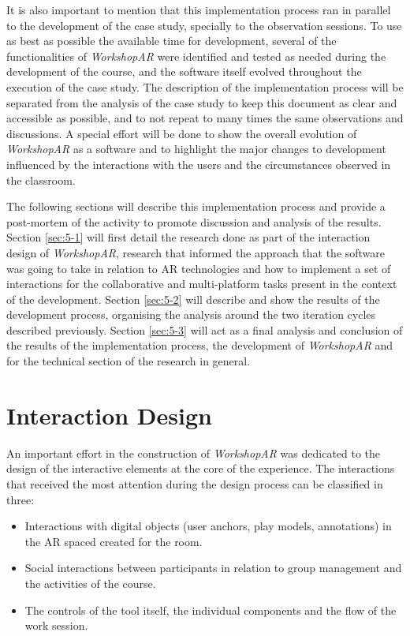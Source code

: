 It is also important to mention that this implementation process ran in parallel to the development of the case study, specially to the observation sessions. To use as best as possible
the available time for development, several of the functionalities of \emph{WorkshopAR} were identified and tested as needed during the development of the course, and the software itself evolved
throughout the execution of the case study. The description of the implementation process will be separated from the analysis of the case study to keep this document as clear and accessible
as possible, and to not repeat to many times the same observations and discussions. A special effort will be done to show the overall evolution of \emph{WorkshopAR} as a software and to
highlight the major changes to development influenced by the interactions with the users and the circumstances observed in the classroom.

The following sections will describe this implementation process and provide a post-mortem of the activity to promote discussion and analysis of the results. Section \ref{sec:5-1} will
first detail the research done as part of the interaction design of \emph{WorkshopAR}, research that informed the approach that the software was going to take in relation to \ac{AR}
technologies and how to implement a set of interactions for the collaborative and multi-platform tasks present in the context of the development. Section \ref{sec:5-2} will describe and
show the results of the development process, organising the analysis around the two iteration cycles described previously. Section \ref{sec:5-3} will act as a final analysis and
conclusion of the results of the implementation process, the development of \emph{WorkshopAR} and for the technical section of the research in general.

\section{Interaction Design \label{sec:5-1}}

An important effort in the construction of \emph{WorkshopAR} was dedicated to the design of the interactive elements at the core of the experience. The interactions that received the most
attention during the design process can be classified in three:

\begin{itemize}
    \item Interactions with digital objects (user anchors, play models, annotations) in the \ac{AR} spaced created for the room.
    \item Social interactions between participants in relation to group management and the activities of the course.
    \item The controls of the tool itself, the individual components and the flow of the work session.
\end{itemize}

